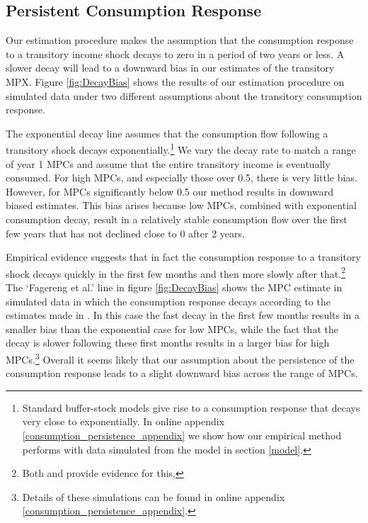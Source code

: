 \documentclass[titlepage]{\econtex}\newcommand{\texname}{ConsumptionHeterogeneity}
\begin{document}
\subsection{Persistent Consumption Response} \label{Consumption_persistence}
Our estimation procedure makes the assumption that the consumption response to a transitory income shock decays to zero in a period of two years or less. A slower decay will lead to a downward bias in our estimates of the transitory MPX. Figure \ref{fig:DecayBias} shows the results of our estimation procedure on simulated data under two different assumptions about the transitory consumption response.

The exponential decay line assumes that the consumption flow following a transitory shock decays exponentially.\footnote{Standard buffer-stock models give rise to a consumption response that decays very close to exponentially. In online appendix \ref{consumption_persistence_appendix} we show how our empirical method performs with data simulated from the model in section \ref{model}.} We vary the decay rate to match a range of year 1 MPCs and assume that the entire transitory income is eventually consumed. For high MPCs, and especially those over 0.5, there is very little bias. However, for MPCs significantly below 0.5 our method results in downward biased estimates. This bias arises because low MPCs, combined with exponential consumption decay, result in a relatively stable consumption flow over the first few years that has not declined close to 0 after 2 years.

Empirical evidence suggests that in fact the consumption response to a transitory shock decays quickly in the first few months and then more slowly after that.\footnote{Both \cite{fagereng_mpc_2016} and \cite{gelman_what_2016} provide evidence for this.} The `Fagereng et al.' line in figure \ref{fig:DecayBias} shows the MPC estimate in simulated data in which the consumption response decays according to the estimates made in \cite{fagereng_mpc_2016}. In this case the fast decay in the first few months results in a smaller bias than the exponential case for low MPCs, while the fact that the decay is slower following these first months results in a larger bias for high MPCs.\footnote{Details of these simulations can be found in online appendix \ref{consumption_persistence_appendix}.} Overall it seems likely that our assumption about the persistence of the consumption response leads to a slight downward bias across the range of MPCs.
\end{document}
